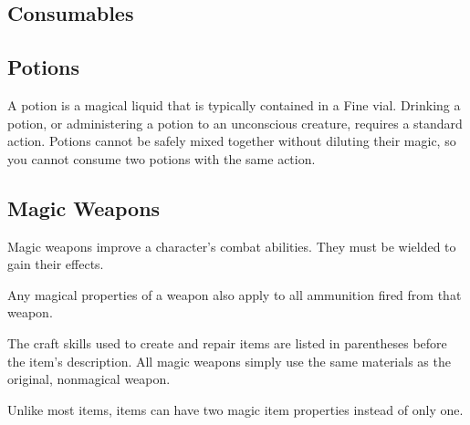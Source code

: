   

  \begin{longcolumn}
    \section{Consumables}\label{Consumables}

      \subsection{Potions}
        A potion is a magical liquid that is typically contained in a Fine vial.
        Drinking a potion, or administering a potion to an unconscious creature, requires a standard action.
        Potions cannot be safely mixed together without diluting their magic, so you cannot consume two potions with the same action.

        
  \end{longcolumn}

  

\begin{longcolumn}
    \section{Magic Weapons}\label{Magic Weapons}
    \begin{longtablepreface}

      Magic weapons improve a character's combat abilities.
      They must be wielded to gain their effects.

       Any magical properties of a  weapon also apply to all ammunition fired from that weapon.

       The craft skills used to create and repair items are listed in parentheses before the item's description.
      All magic weapons simply use the same materials as the original, nonmagical weapon.

       Unlike most items,  items can have two magic item properties instead of only one.
    \end{longtablepreface}

    

\end{longcolumn}

